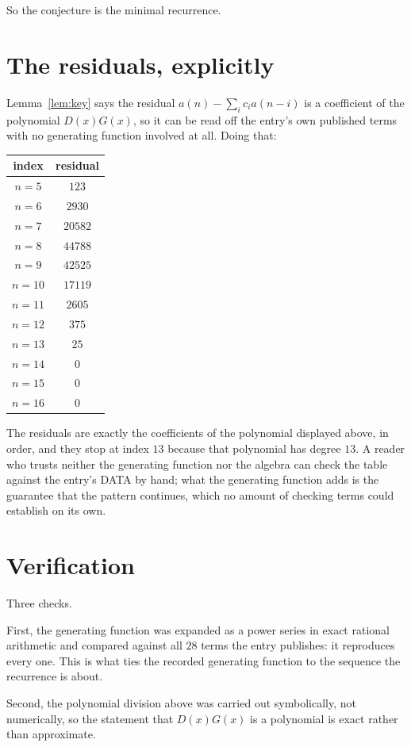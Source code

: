 \documentclass[11pt,a4paper]{article}
\theoremstyle{plain}
\theoremstyle{definition}
\begin{document}
So the conjecture is the minimal recurrence.

\section{The residuals, explicitly}

Lemma~\ref{lem:key} says the residual $a(n)-\sum_ic_ia(n-i)$ is a coefficient of the
polynomial $D(x)G(x)$, so it can be read off the entry's own published terms with no
generating function involved at all. Doing that:
\begin{center}
\begin{tabular}{cc}
index & residual \\ \hline
$n=5$ & $123$ \\
$n=6$ & $2930$ \\
$n=7$ & $20582$ \\
$n=8$ & $44788$ \\
$n=9$ & $42525$ \\
$n=10$ & $17119$ \\
$n=11$ & $2605$ \\
$n=12$ & $375$ \\
$n=13$ & $25$ \\
$n=14$ & $0$ \\
$n=15$ & $0$ \\
$n=16$ & $0$
\end{tabular}
\end{center}
The residuals are exactly the coefficients of the polynomial displayed above, in order, and
they stop at index $13$ because that polynomial has degree $13$. A reader who trusts
neither the generating function nor the algebra can check the table against the entry's DATA
by hand; what the generating function adds is the guarantee that the pattern continues, which
no amount of checking terms could establish on its own.

\section{Verification}

Three checks.

First, the generating function was expanded as a power series in exact rational arithmetic and
compared against all $28$ terms the entry publishes: it reproduces every one. This is
what ties the recorded generating function to the sequence the recurrence is about.

Second, the polynomial division above was carried out symbolically, not numerically, so the
statement that $D(x)G(x)$ is a polynomial is exact rather than approximate.
\end{document}

